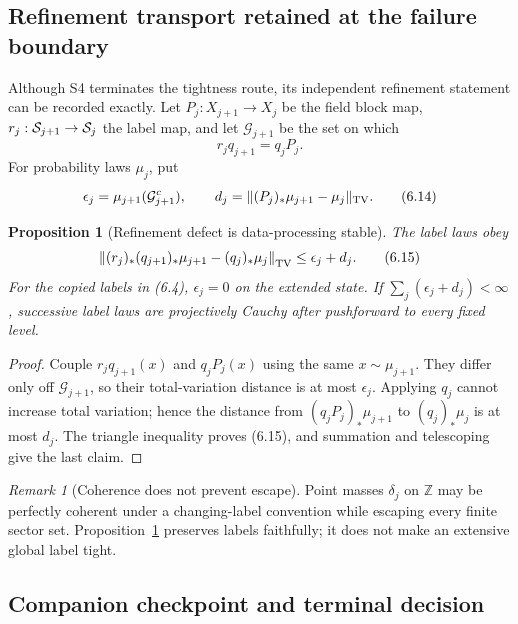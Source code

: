 \documentclass[11pt]{article}
\newtheorem{proposition}[theorem]{Proposition}
\theoremstyle{definition}
\theoremstyle{remark}
\newtheorem{remark}[theorem]{Remark}
\begin{document}
\subsection{Refinement transport retained at the failure boundary}

Although S4 terminates the tightness route, its independent refinement
statement can be recorded exactly.  Let $P_j:X_{j+1}\to X_j$ be the field
block map, $r_j:{\cal S}_{j+1}\to{\cal S}_j$ the label map, and let
$\mathcal G_{j+1}$ be the set on which
\[
 r_jq_{j+1}=q_jP_j.
\]
For probability laws $\mu_j$, put
\[
 \epsilon_j=\mu_{j+1}({\cal G}_{j+1}^c),\qquad
 d_j=\|(P_j)_*\mu_{j+1}-\mu_j\|_{\rm TV}.                  \tag{6.14}
\]

\begin{proposition}[Refinement defect is data-processing stable]
\label{prop:refinement-defect}
The label laws obey
\[
 \left\|(r_j)_*(q_{j+1})_*\mu_{j+1}
       -(q_j)_*\mu_j\right\|_{\rm TV}
 \le\epsilon_j+d_j.                                        \tag{6.15}
\]
For the copied labels in (6.4), $\epsilon_j=0$ on the extended state.
If $\sum_j(\epsilon_j+d_j)<\infty$, successive label laws are projectively
Cauchy after pushforward to every fixed level.
\end{proposition}

\begin{proof}
Couple $r_jq_{j+1}(x)$ and $q_jP_j(x)$ using the same
$x\sim\mu_{j+1}$.  They differ only off $\mathcal G_{j+1}$, so their
total-variation distance is at most $\epsilon_j$.  Applying $q_j$ cannot
increase total variation; hence the distance from
$(q_jP_j)_*\mu_{j+1}$ to $(q_j)_*\mu_j$ is at most $d_j$.  The triangle
inequality proves (6.15), and summation and telescoping give the last claim.
\end{proof}

\begin{remark}[Coherence does not prevent escape]
Point masses $\delta_j$ on $\mathbb Z$ may be perfectly coherent under a
changing-label convention while escaping every finite sector set.
Proposition~\ref{prop:refinement-defect} preserves labels faithfully; it
does not make an extensive global label tight.
\end{remark}

\subsection{Companion checkpoint and terminal decision}
\end{document}
